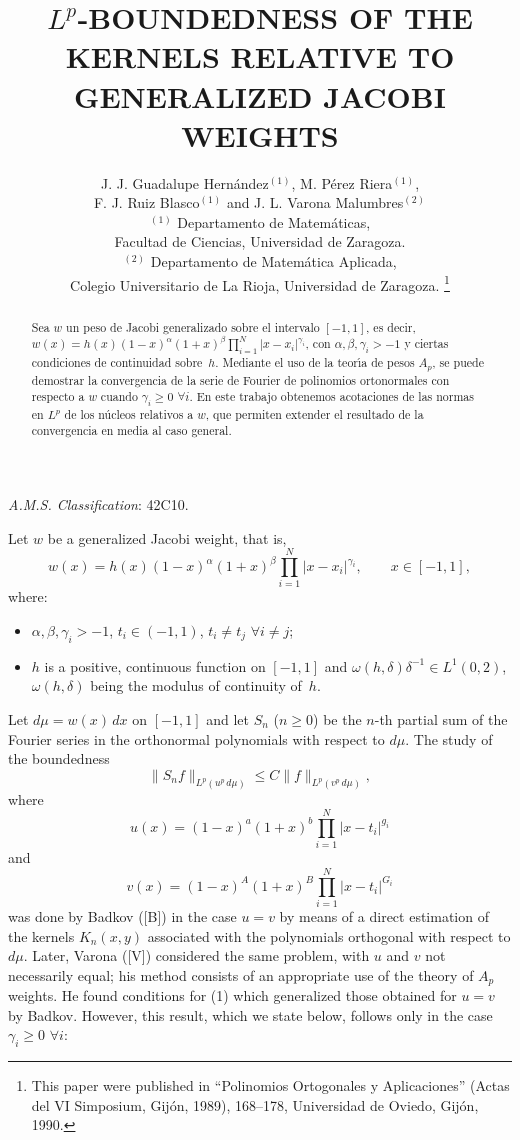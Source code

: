 \documentclass[a4paper,12pt]{article}
\date{}
\title{\large \bfseries \boldmath $L^{p}$-BOUNDEDNESS OF THE
KERNELS RELATIVE TO GENERALIZED JACOBI WEIGHTS}
\author{%
J. J. Guadalupe Hern\'{a}ndez$^{(1)}$, M. P\'{e}rez Riera$^{(1)}$,\\[2pt]
F. J. Ruiz Blasco$^{(1)}$ and J. L. Varona Malumbres$^{(2)}$\\[5pt]
\small $^{(1)}$ Departamento de Matem\'{a}ticas,\\[-2pt]
\small Facultad de Ciencias, Universidad de Zaragoza.\\[3pt]
\small $^{(2)}$ Departamento de Matem\'{a}tica Aplicada,\\[-2pt]
\small Colegio Universitario de La Rioja, Universidad de Zaragoza.%
\renewcommand\thefootnote{}%
\renewcommand\footnotemark{}%
\footnote{This paper were published in
``Polinomios Ortogonales y Aplicaciones''
(Actas del VI Simposium, Gij\'on, 1989),
168--178, Universidad de Oviedo, Gij\'on, 1990.}%
}
\theoremstyle{plain}
\theoremstyle{definition}
\begin{document}
\maketitle

\noindent\textit{A.M.S. Classification}: 42C10.


\begin{abstract}
Sea $w$ un peso de Jacobi generalizado sobre el intervalo $[-1,1]$,
es decir, $w(x) = h(x)(1-x)^{\alpha} (1+x)^{\beta}
\prod_{i=1}^{N} |x-x_{i}|^{\gamma_{i}}$, con $\alpha, \beta,
\gamma_{i} > -1$ y ciertas condiciones de continuidad
sobre~$h$. Mediante el uso de la teor\'{\i}a de pesos $A_{p}$, se puede
demostrar la convergencia de la serie de Fourier de polinomios
ortonormales con respecto a $w$ cuando $\gamma_{i} \geq 0$
$\forall i$. En este trabajo obtenemos acotaciones
de las normas en $L^{p}$ de los n\'{u}cleos relativos a $w$, que permiten
extender el resultado de la convergencia en media al caso general.
\end{abstract}



Let $w$ be a generalized Jacobi weight, that is,
$$
w(x) = h(x)(1-x)^{\alpha} (1+x)^{\beta}
\prod_{i=1}^{N} |x-x_{i}|^{\gamma_{i}},
\qquad x \in [-1,1],
$$
where:
\begin{itemize}
\item[(a)] $\alpha, \beta, \gamma_{i} > -1$,
$t_{i} \in (-1,1)$, $t_{i}\neq t_{j}$ $\forall i \neq j$;
\item[(b)] $h$ is a positive, continuous function on $[-1,1]$ and
$\omega(h,\delta) \delta^{-1} \in L^{1}(0,2)$,
$\omega(h,\delta)$ being the modulus of continuity of~$h$.
\end{itemize}

Let $d\mu = w(x)\,dx$ on $[-1,1]$ and let $S_{n}$ ($n \geq 0$)
be the $n$-th partial sum of the Fourier series in the orthonormal
polynomials with respect to $d\mu$. The study of the boundedness
\begin{equation}
\| S_{n}f \|_{L^{p}(u^{p}\,d\mu)}
\leq C \| f \|_{L^{p}(v^{p}\,d\mu)},
\tag{1}
\end{equation}
where
$$
u(x) = (1- x)^{a}(1+ x)^{b} \prod_{i=1}^{N} | x- t_{i} |^{g_{i}}
$$
and
$$
v(x) = (1- x)^{A}(1+ x)^{B} \prod_{i=1}^{N} | x- t_{i} |^{G_{i}}
$$
was done by Badkov ([B]) in the case $u = v$
by means of a direct estimation of the kernels $K_{n}(x,y)$
associated with the polynomials orthogonal with respect to $d\mu$.
Later, Varona ([V]) considered the same problem, with $u$ and $v$ not
necessarily equal; his method consists of an appropriate use
of the theory of $A_{p}$ weights. He found conditions for (1)
which generalized those obtained for $u = v$
by Badkov. However, this result, which we state below, follows
only in the case $\gamma_{i} \geq 0$ $\forall i$:
\end{document}

